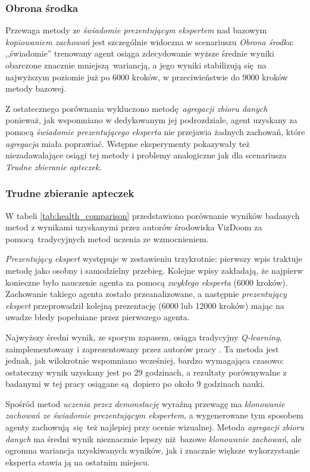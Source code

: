 \subsubsection{Obrona środka}
Przewaga metody ze \textit{świadomie prezentującym ekspertem} nad bazowym \textit{kopiowaniem zachowań} jest szczególnie widoczna w scenariuszu \textit{Obrona środka}: ,,świadomie'' trenowany agent osiąga zdecydowanie wyższe średnie wyniki obarczone znacznie mniejszą wariancją, a jego wyniki stabilizują się na najwyższym poziomie już po 6000 kroków, w przeciwieństwie do 9000 kroków metody bazowej.

Z ostatecznego porównania wykluczono metodę \textit{agregacji zbioru danych} ponieważ, jak wspomniano w dedykowanym jej podrozdziale, agent uzyskany za pomocą \textit{świadomie prezentującego eksperta} nie przejawia żadnych zachowań, które \textit{agregacja} miała poprawiać. Wstępne eksperymenty pokazywały też niezadawalające osiągi tej metody i problemy analogiczne jak dla scenariusza \textit{Trudne zbieranie apteczek}.

\subsubsection{Trudne zbieranie apteczek}

W tabeli \ref{tab:health_comparison} przedstawiono porównanie wyników badanych metod z wynikami uzyskanymi przez autorów środowiska VizDoom za pomocą tradycyjnych metod uczenia ze wzmocnieniem.

\textit{Prezentujący ekspert} występuje w zestawieniu trzykrotnie: pierwszy wpis traktuje metodę jako osobny i samodzielny przebieg. Kolejne wpisy zakładają, że najpierw konieczne było nauczenie agenta za pomocą \textit{zwykłego eksperta} (6000 kroków). Zachowanie takiego agenta zostało przeanalizowane, a następnie \textit{prezentujący ekspert} przeprowadził kolejną prezentację (6000 lub 12000 kroków) mając na uwadze błedy popełniane przez pierwszego agenta.

Najwyższy średni wynik, ze sporym zapasem, osiąga tradycyjny \textit{Q-learning}, zaimplementowany i zaprezentowany przez autorów pracy \cite{DBLP:journals/corr/KempkaWRTJ16}. Ta metoda jest jednak, jak wilokrotnie wspomniano wcześniej, bardzo wymagająca czasowo: ostateczny wynik uzyskany jest po 29 godzinach, a rezultaty porównywalne z badanymi w tej pracy osiągane są dopiero po około 9 godzinach nauki.

Spośród metod \textit{uczenia przez demonstację} wyraźną przewagę ma \textit{klonowanie zachowań ze świadomie prezentującym ekspertem}, a wygenerowane tym sposobem agenty zachowują się też najlepiej przy ocenie wizualnej. Metoda \textit{agregacji zbioru danych} ma średni wynik nieznacznie lepszy niż bazowe \textit{klonowanie zachowań}, ale ogromna wariancja uzyskiwanych wyników, jak i znacznie większe wykorzystanie eksperta stawia ją na ostatnim miejscu.

